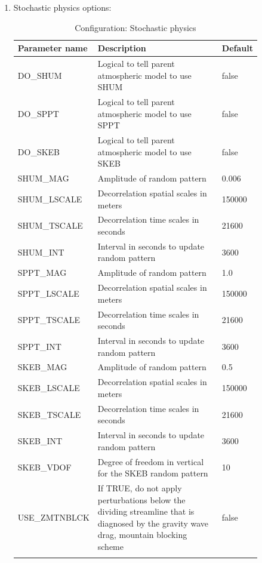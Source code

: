 \documentclass[11pt,fleqn]{report}              %
\begin{document}
\begin{enumerate}
\item Stochastic physics options:
{
\scriptsize
\begin{longtable}{ p{0.15\linewidth} | p{0.6\linewidth} | p{0.1\linewidth}}
\hline
\hline
Parameter name & Description & Default \\
\hline
 DO\_SHUM & Logical to tell parent atmospheric model to use SHUM & false \\
 DO\_SPPT & Logical to tell parent atmospheric model to use SPPT & false \\
 DO\_SKEB & Logical to tell parent atmospheric model to use SKEB & false \\
 SHUM\_MAG & Amplitude of random pattern & 0.006 \\
 SHUM\_LSCALE & Decorrelation spatial scales in meters  & 150000 \\
 SHUM\_TSCALE & Decorrelation time scales in seconds & 21600 \\
 SHUM\_INT & Interval in seconds to update random pattern & 3600 \\
 SPPT\_MAG & Amplitude of random pattern & 1.0 \\
 SPPT\_LSCALE & Decorrelation spatial scales in meters & 150000 \\
 SPPT\_TSCALE & Decorrelation time scales in seconds & 21600 \\
 SPPT\_INT & Interval in seconds to update random pattern & 3600 \\
 SKEB\_MAG & Amplitude of random pattern & 0.5 \\
 SKEB\_LSCALE & Decorrelation spatial scales in meters & 150000 \\
 SKEB\_TSCALE & Decorrelation time scales in seconds & 21600 \\
 SKEB\_INT & Interval in seconds to update random pattern & 3600 \\
 SKEB\_VDOF & Degree of freedom in vertical for the SKEB random pattern & 10 \\
 USE\_ZMTNBLCK & If TRUE, do not apply perturbations below the dividing streamline that is diagnosed by the gravity wave drag, mountain blocking scheme & false \\
\hline
\caption{Configuration: Stochastic physics}
\label{table:config_stophy}
\end{longtable}
}


\end{enumerate}
\end{document}
